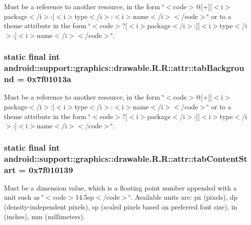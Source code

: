 Must be a reference to another resource, in the form \char`\"{}$<$code$>$@\mbox{[}+\mbox{]}\mbox{[}$<$i$>$package$<$/i$>$:\mbox{]}$<$i$>$type$<$/i$>$:$<$i$>$name$<$/i$>$$<$/code$>$\char`\"{} or to a theme attribute in the form \char`\"{}$<$code$>$?\mbox{[}$<$i$>$package$<$/i$>$:\mbox{]}\mbox{[}$<$i$>$type$<$/i$>$:\mbox{]}$<$i$>$name$<$/i$>$$<$/code$>$\char`\"{}. \hypertarget{classandroid_1_1support_1_1graphics_1_1drawable_1_1_r_1_1attr_31dbd3283763b84669acd3cf07072cd7}{
\subsubsection[{tabBackground}]{\setlength{\rightskip}{0pt plus 5cm}static final int android::support::graphics::drawable.R.R::attr::tabBackground = 0x7f01013a}}
\label{classandroid_1_1support_1_1graphics_1_1drawable_1_1_r_1_1attr_31dbd3283763b84669acd3cf07072cd7}


Must be a reference to another resource, in the form \char`\"{}$<$code$>$@\mbox{[}+\mbox{]}\mbox{[}$<$i$>$package$<$/i$>$:\mbox{]}$<$i$>$type$<$/i$>$:$<$i$>$name$<$/i$>$$<$/code$>$\char`\"{} or to a theme attribute in the form \char`\"{}$<$code$>$?\mbox{[}$<$i$>$package$<$/i$>$:\mbox{]}\mbox{[}$<$i$>$type$<$/i$>$:\mbox{]}$<$i$>$name$<$/i$>$$<$/code$>$\char`\"{}. \hypertarget{classandroid_1_1support_1_1graphics_1_1drawable_1_1_r_1_1attr_2b1dfda823425a2525ccbf51a3cddaa8}{
\subsubsection[{tabContentStart}]{\setlength{\rightskip}{0pt plus 5cm}static final int android::support::graphics::drawable.R.R::attr::tabContentStart = 0x7f010139}}
\label{classandroid_1_1support_1_1graphics_1_1drawable_1_1_r_1_1attr_2b1dfda823425a2525ccbf51a3cddaa8}


Must be a dimension value, which is a floating point number appended with a unit such as \char`\"{}$<$code$>$14.5sp$<$/code$>$\char`\"{}. Available units are: px (pixels), dp (density-independent pixels), sp (scaled pixels based on preferred font size), in (inches), mm (millimeters). 

